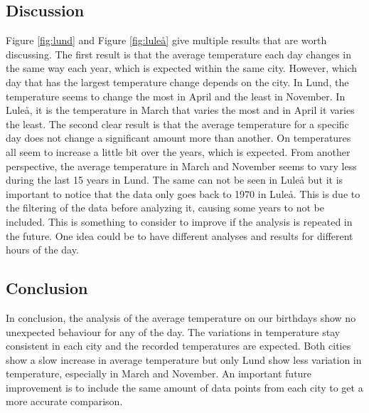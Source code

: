\subsection{Discussion}
Figure \ref{fig:lund} and Figure \ref{fig:luleå} give multiple results that are worth discussing. The first result is that the average temperature each day changes in the same way each year, which is expected within the same city. However, which day that has the largest temperature change depends on the city. In Lund, the temperature seems to change the most in April and the least in November. In Luleå, it is the temperature in March that varies the most and in April it varies the least. The second clear result is that the average temperature for a specific day does not change a significant amount more than another. On temperatures all seem to increase a little bit over the years, which is expected. From another perspective, the average temperature in March and November seems to vary less during the last 15 years in Lund. The same can not be seen in Luleå but it is important to notice that the data only goes back to 1970 in Luleå. This is due to the filtering of the data before analyzing it, causing some years to not be included. This is something to consider to improve if the analysis is repeated in the future. One idea could be to have different analyses and results for different hours of the day. 

\subsection{Conclusion}
In conclusion, the analysis of the average temperature on our birthdays show no unexpected behaviour for any of the day. The variations in temperature stay consistent in each city and the recorded temperatures are expected. Both cities show a slow increase in average temperature but only Lund show less variation in temperature, especially in March and November. An important future improvement is to include the same amount of data points from each city to get a more accurate comparison. 
